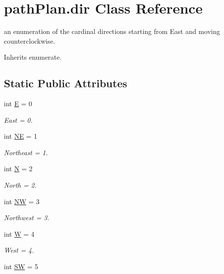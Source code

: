 \hypertarget{classpath_plan_1_1dir}{}\section{path\+Plan.\+dir Class Reference}
\label{classpath_plan_1_1dir}


an enumeration of the cardinal directions starting from East and moving counterclockwise.  




Inherits enumerate.

\subsection*{Static Public Attributes}
\begin{DoxyCompactItemize}
\item 
int \mbox{\hyperlink{classpath_plan_1_1dir_ace7274c1b8112b1e26f8ad53e611cb55}{E}} = 0
\begin{DoxyCompactList}\small\item\em East = 0. \end{DoxyCompactList}\item 
int \mbox{\hyperlink{classpath_plan_1_1dir_a577daab51fe30a40ad5cff407197018d}{NE}} = 1
\begin{DoxyCompactList}\small\item\em Northeast = 1. \end{DoxyCompactList}\item 
int \mbox{\hyperlink{classpath_plan_1_1dir_a86f4448228a961438a153a2420fec66b}{N}} = 2
\begin{DoxyCompactList}\small\item\em North = 2. \end{DoxyCompactList}\item 
int \mbox{\hyperlink{classpath_plan_1_1dir_a258cdd8e6d1f4cdcbe6285c13ba1390a}{NW}} = 3
\begin{DoxyCompactList}\small\item\em Northwest = 3. \end{DoxyCompactList}\item 
int \mbox{\hyperlink{classpath_plan_1_1dir_a73cd667b05ff0a4836e3c07ce8f458ce}{W}} = 4
\begin{DoxyCompactList}\small\item\em West = 4. \end{DoxyCompactList}\item 
int \mbox{\hyperlink{classpath_plan_1_1dir_a27d5dbc908c392e61e749c8090cbfb75}{SW}} = 5

\end{DoxyCompactItemize}
